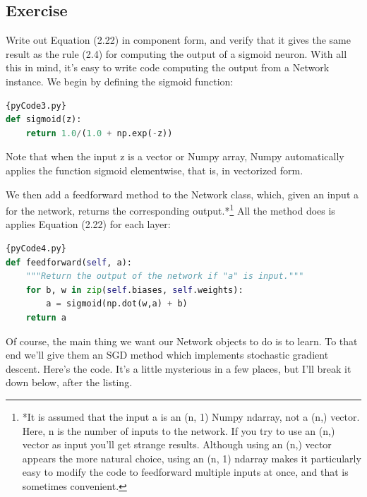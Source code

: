 \documentclass[a4paper,12pt]{report}%
\begin{document}
\subsection{Exercise}
Write out Equation (2.22) in component form, and verify that it gives the same result as the rule (2.4) for computing the output of a sigmoid neuron.
With all this in mind, it's easy to write code computing the output from a Network instance. We begin by defining the sigmoid function:

\begin{lstlisting}[language=Python,breaklines,basicstyle=\footnotesize\ttfamily]{pyCode3.py}
def sigmoid(z):
    return 1.0/(1.0 + np.exp(-z))
\end{lstlisting}

Note that when the input z is a vector or Numpy array, Numpy automatically applies the function sigmoid elementwise, that is, in vectorized form.

We then add a feedforward method to the Network class, which, given an input a for the network, returns the corresponding output.*\footnote{\color{blue}*It is assumed that the input a is an (n, 1) Numpy ndarray, not a (n,) vector. Here, n is the number of inputs to the network. If you try to use an (n,) vector as input you'll get strange results. Although using an (n,) vector appears the more natural choice, using an (n, 1) ndarray makes it particularly easy to modify the code to feedforward multiple inputs at once, and that is sometimes convenient.} All the method does is applies Equation (2.22) for each layer:

\begin{lstlisting}[language=Python,breaklines,basicstyle=\footnotesize\ttfamily]{pyCode4.py}
def feedforward(self, a):
    """Return the output of the network if "a" is input."""
    for b, w in zip(self.biases, self.weights):
        a = sigmoid(np.dot(w,a) + b)
    return a
\end{lstlisting}

Of course, the main thing we want our Network objects to do is to learn. To that end we'll give them an SGD method which implements stochastic gradient descent. Here's the code. It's a little mysterious in a few places, but I'll break it down below, after the listing.
\end{document}
